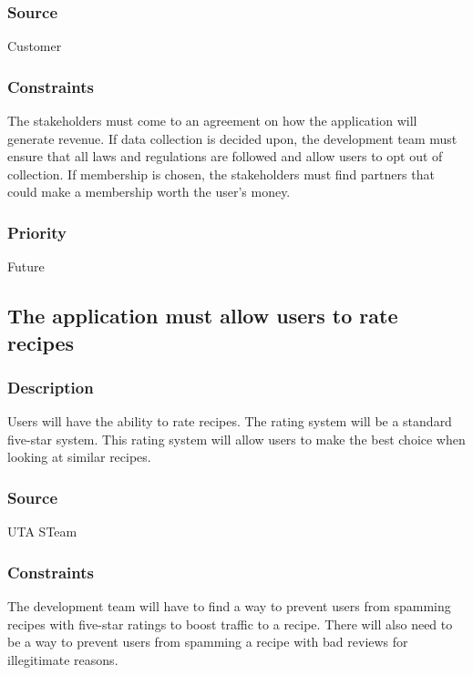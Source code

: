 \subsubsection{Source}
Customer
\subsubsection{Constraints}
The stakeholders must come to an agreement on how the application will generate revenue. If data collection is decided upon, the development team must ensure that all laws and regulations are followed and allow users to opt out of collection. If membership is chosen, the stakeholders must find partners that could make a membership worth the user's money.
\subsubsection{Priority}
Future

\subsection{The application must allow users to rate recipes}
\subsubsection{Description}
Users will have the ability to rate recipes. The rating system will be a standard five-star system. This rating system will allow users to make the best choice when looking at similar recipes.
\subsubsection{Source}
UTA STeam
\subsubsection{Constraints}
The development team will have to find a way to prevent users from spamming recipes with five-star ratings to boost traffic to a recipe. There will also need to be a way to prevent users from spamming a recipe with bad reviews for illegitimate reasons.
